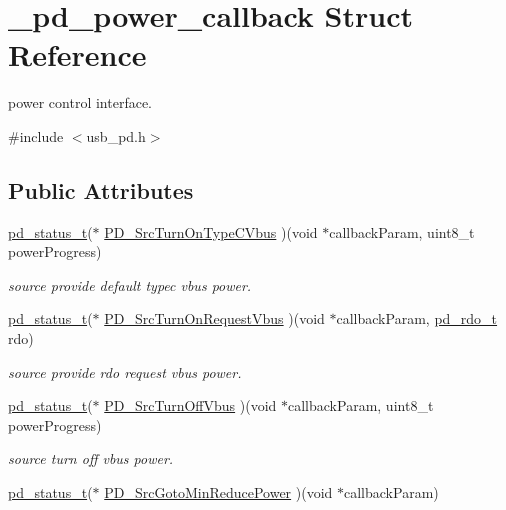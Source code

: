 \hypertarget{struct__pd__power__callback}{\section{\-\_\-pd\-\_\-power\-\_\-callback Struct Reference}
\label{struct__pd__power__callback}
}


power control interface.  




{\ttfamily \#include $<$usb\-\_\-pd.\-h$>$}

\subsection*{Public Attributes}
\begin{DoxyCompactItemize}
\item 
\hyperlink{group__usb__pd__stack_ga04a1f331d9807a70ab9bb753f5ed1c80}{pd\-\_\-status\-\_\-t}($\ast$ \hyperlink{struct__pd__power__callback_a81922cf6a4f22bcee69123e95fac7758}{P\-D\-\_\-\-Src\-Turn\-On\-Type\-C\-Vbus} )(void $\ast$callback\-Param, uint8\-\_\-t power\-Progress)
\begin{DoxyCompactList}\small\item\em source provide default typec vbus power. \end{DoxyCompactList}\item 
\hyperlink{group__usb__pd__stack_ga04a1f331d9807a70ab9bb753f5ed1c80}{pd\-\_\-status\-\_\-t}($\ast$ \hyperlink{struct__pd__power__callback_ab7d47b7b6babdf2f74c6d1344c685168}{P\-D\-\_\-\-Src\-Turn\-On\-Request\-Vbus} )(void $\ast$callback\-Param, \hyperlink{group__usb__pd__stack_ga4dcb1103574222cf94d4b45128f2b884}{pd\-\_\-rdo\-\_\-t} rdo)
\begin{DoxyCompactList}\small\item\em source provide rdo request vbus power. \end{DoxyCompactList}\item 
\hyperlink{group__usb__pd__stack_ga04a1f331d9807a70ab9bb753f5ed1c80}{pd\-\_\-status\-\_\-t}($\ast$ \hyperlink{struct__pd__power__callback_a1afed4126bcbe1ba278eb27f31e99c9c}{P\-D\-\_\-\-Src\-Turn\-Off\-Vbus} )(void $\ast$callback\-Param, uint8\-\_\-t power\-Progress)
\begin{DoxyCompactList}\small\item\em source turn off vbus power. \end{DoxyCompactList}\item 
\hyperlink{group__usb__pd__stack_ga04a1f331d9807a70ab9bb753f5ed1c80}{pd\-\_\-status\-\_\-t}($\ast$ \hyperlink{struct__pd__power__callback_a50891e9bf6ceb5d45b27ec49e46b11fc}{P\-D\-\_\-\-Src\-Goto\-Min\-Reduce\-Power} )(void $\ast$callback\-Param)

\end{DoxyCompactItemize}
